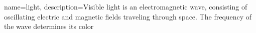 {
    name=light,
    description={Visible light is an electromagnetic wave, consisting of oscillating electric and magnetic fields traveling through space. The frequency of the wave determines its color}
}
